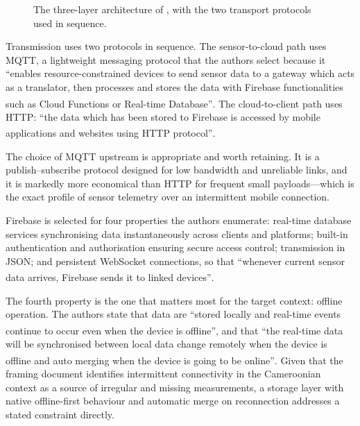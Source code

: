\documentclass[12pt,a4paper,oneside]{report}
\newcommand{\bq}[1]{``#1''\textsuperscript{\dag}}
\begin{document}
\begin{figure}[htbp]
\centering
{}
\caption{The three-layer architecture of \textcite{efendi2025}, with the two transport protocols used in sequence.}\label{fig:iot-layers}
\end{figure}

Transmission uses two protocols in sequence. The sensor-to-cloud path uses MQTT, a lightweight messaging protocol that the authors select because it \bq{enables resource-constrained devices to send sensor data to a gateway which acts as a translator, then processes and stores the data with Firebase functionalities such as Cloud Functions or Real-time Database}. The cloud-to-client path uses HTTP: \bq{the data which has been stored to Firebase is accessed by mobile applications and websites using HTTP protocol}.

The choice of MQTT upstream is appropriate and worth retaining. It is a publish--subscribe protocol designed for low bandwidth and unreliable links, and it is markedly more economical than HTTP for frequent small payloads---which is the exact profile of sensor telemetry over an intermittent mobile connection.

Firebase is selected for four properties the authors enumerate: real-time database services synchronising data instantaneously across clients and platforms; built-in authentication and authorisation ensuring secure access control; transmission in JSON; and persistent WebSocket connections, so that \bq{whenever current sensor data arrives, Firebase sends it to linked devices}.

The fourth property is the one that matters most for the target context: offline operation. The authors state that data are \bq{stored locally and real-time events continue to occur even when the device is offline}, and that \bq{the real-time data will be synchronised between local data change remotely when the device is offline and auto merging when the device is going to be online}. Given that the framing document identifies intermittent connectivity in the Cameroonian context as a source of irregular and missing measurements, a storage layer with native offline-first behaviour and automatic merge on reconnection addresses a stated constraint directly.
\end{document}
